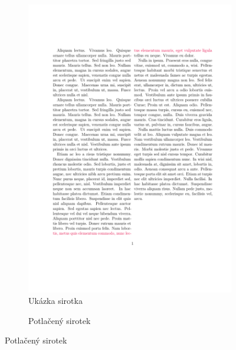 \documentclass{csbulletin}
\begin{document}
  


  \begin{figure}[htbp]
\begin{subfigure}[t]{0.45\textwidth}
  \caption{Ukázka sirotka}
  \label{fig:widow}
  \begin{center}
    \includegraphics[width=\textwidth,page=1]{examples/widow.pdf}
  \end{center}
\end{subfigure}
\hfill
\begin{subfigure}[t]{0.45\textwidth}
  \caption{Potlačený sirotek}
  \begin{center}

\end{center}
\end{subfigure}
\end{figure}
\end{document}
